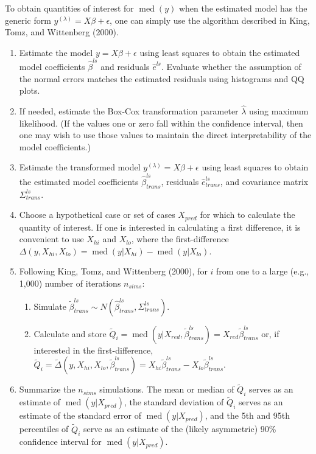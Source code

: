 \documentclass[12pt]{article}
\DeclareMathOperator{\med}{med}
\begin{document}
To obtain quantities of interest for $\med(y)$ when the estimated model has the generic form $y^{(\lambda)} = X\beta + \epsilon$, one can simply use the algorithm described in King, Tomz, and Wittenberg (2000).
\begin{enumerate}
\item Estimate the model $y = X\beta + \epsilon$ using least squares to obtain the estimated model coefficients $\hat{\beta}^{ls}$ and residuals $\hat{e}^{ls}$. Evaluate whether the assumption of the normal errors matches the estimated residuals using histograms and QQ plots.
\item If needed, estimate the Box-Cox transformation parameter $\hat{\lambda}$ using maximum likelihood. (If the values one or zero fall within the confidence interval, then one may wish to use those values to maintain the direct interpretability of the model coefficients.)
\item Estimate the transformed model $y^{(\lambda)} = X\beta + \epsilon$ using least squares to obtain the estimated model coefficients $\hat{\beta}^{ls}_{trans}$, residuals $\hat{e}^{ls}_{trans}$, and covariance matrix $\Sigma^{ls}_{trans}$.
\item Choose a hypothetical case or set of cases $X_{pred}$ for which to calculate the quantity of interest. If one is interested in calculating a first difference, it is convenient to use $X_{hi}$ and $X_{lo}$, where the first-difference $\Delta(y, X_{hi}, X_{lo}) = \med(y | X_{hi}) - \med(y | X_{lo})$.
\item Following King, Tomz, and Wittenberg (2000), for $i$ from one to a large (e.g., 1,000) number of iterations $n_{sims}$:
	\begin{enumerate}
	\item Simulate $\tilde{\beta}^{ls}_{trans} \sim N\left(\hat{\beta}^{ls}_{trans}, \Sigma^{ls}_{trans}\right)$.
	\item Calculate and store $\tilde{Q}_i = \med(y | X_{red}, \tilde{\beta}^{ls}_{trans}) = X_{red}\tilde{\beta}^{ls}_{trans}$ or, if interested in the first-difference, $\tilde{Q}_i = \tilde{\Delta}(y, X_{hi}, X_{lo}, \tilde{\beta}^{ls}_{trans}) = X_{hi}\tilde{\beta}^{ls}_{trans} - X_{lo}\tilde{\beta}^{ls}_{trans}$.
	\end{enumerate}
\item Summarize the $n_{sims}$ simulations. The mean or median of $\tilde{Q}_i$ serves as an estimate of $\med(y | X_{pred})$, the standard deviation of $\tilde{Q}_i$ serves as an estimate of the standard error of $\med(y | X_{pred})$, and the 5th and 95th percentiles of $\tilde{Q}_i$ serve as an estimate of the (likely asymmetric) 90\% confidence interval for $\med(y | X_{pred})$.
\end{enumerate}
\end{document}
